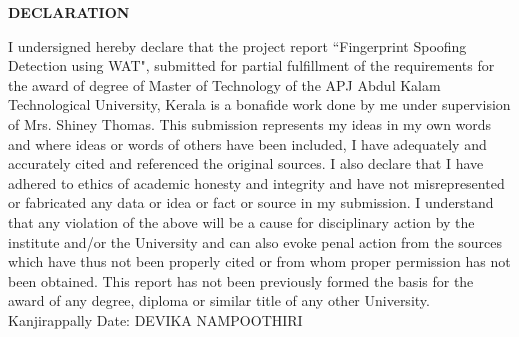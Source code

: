 \begin{titlepage} %
\begin{center} 
\textbf {\Large{DECLARATION}} 
\end{center}
I undersigned hereby declare that the project report ``Fingerprint Spoofing Detection using WAT", submitted for partial fulfillment of the requirements for the award of degree of Master of Technology of
the APJ Abdul Kalam Technological University, Kerala is a bonafide work done by me
under supervision of Mrs. Shiney Thomas. This submission represents my ideas in
my own words and where ideas or words of others have been included, I have adequately
and accurately cited and referenced the original sources. I also declare that I have
adhered to ethics of academic honesty and integrity and have not misrepresented or
fabricated any data or idea or fact or source in my submission. I understand that any
violation of the above will be a cause for disciplinary action by the institute and/or the
University and can also evoke penal action from the sources which have thus not been
properly cited or from whom proper permission has not been obtained. This report has
not been previously formed the basis for the award of any degree, diploma or similar title
of any other University.
\vspace{20pt}
\newline  Kanjirappally
\vspace{1pt}
\newline Date: \hspace{320pt} 
\newline \vspace{1pt} \hspace{320pt} DEVIKA NAMPOOTHIRI
\end{titlepage}
